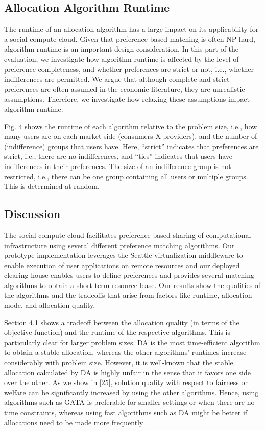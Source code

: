 \documentclass[a4paper,12pt]{article}
\begin{document}
	\subsection{Allocation Algorithm Runtime}
	The runtime of an allocation algorithm has a large impact on
its applicability for a social compute cloud. Given that preference-based matching is often NP-hard, algorithm runtime
is an important design consideration. In this part of the evaluation, we investigate how algorithm runtime is affected by
the level of preference completeness, and whether preferences are strict or not, i.e., whether indifferences are permitted. We argue that although complete and strict preferences
are often assumed in the economic literature, they are unrealistic assumptions. Therefore, we investigate how relaxing
these assumptions impact algorithm runtime.

	\par Fig. 4 shows the runtime of each algorithm relative to the
problem size, i.e., how many users are on each market side
(consumers X  providers), and the number of (indifference)
groups that users have. Here, “strict” indicates that preferences are strict, i.e., there are no indifferences, and “ties”
indicates that users have indifferences in their preferences.
The size of an indifference group is not restricted, i.e., there
can be one group containing all users or multiple groups.
This is determined at random.
	\subsection{Discussion}
The social compute cloud facilitates preference-based sharing of computational infrastructure using several different
preference matching algorithms. Our prototype implementation leverages the Seattle virtualization middleware to
enable execution of user applications on remote resources
and our deployed clearing house enables users to define
preferences and provides several matching algorithms to
obtain a short term resource lease. Our results show the
qualities of the algorithms and the tradeoffs that arise from
factors like runtime, allocation mode, and allocation quality.
	\par Section 4.1 shows a tradeoff between the allocation quality (in terms of the objective function) and the runtime of
the respective algorithms. This is particularly clear for
larger problem sizes. DA is the most time-efficient algorithm to obtain a stable allocation, whereas the other algorithms’ runtimes increase considerably with problem size.
However, it is well-known that the stable allocation calculated by DA is highly unfair in the sense that it favors one
side over the other. As we show in [25], solution quality
with respect to fairness or welfare can be significantly
increased by using the other algorithms. Hence, using algorithms such as GATA is preferable for smaller settings or
when there are no time constraints, whereas using fast algorithms such as DA might be better if allocations need to be
made more frequently
\end{document}
